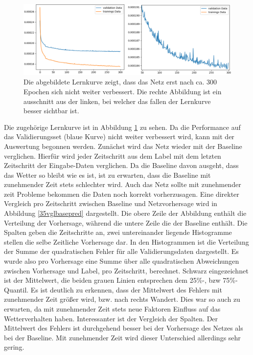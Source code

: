 \begin{figure}[h]
	\centering
	\includegraphics[width=\linewidth]{pics/lc_35minMSE.png}
	\caption[Lernkurve des UNet zur 35 Minuten Radar-Vorhersage.]{Die abgebildete Lernkurve zeigt, dass das Netz erst nach ca. 300 Epochen sich nicht weiter verbessert. Die rechte Abbildung ist ein ausschnitt aus der linken, bei welcher das fallen der Lernkurve besser sichtbar ist.}
	\label{lc_35minMSE}
\end{figure}

Die zugehörige Lernkurve ist in Abbildung \ref{lc_35minMSE} zu sehen. Da die Performance auf das Validierungsset (blaue Kurve) nicht weiter verbessert wird, kann mit der Auswertung begonnen werden.
Zunächst wird das Netz wieder mit der Baseline verglichen. Hierfür wird jeder Zeitschritt aus dem Label mit dem letzten Zeitschritt der Eingabe-Daten verglichen. Da die Baseline davon ausgeht, dass das Wetter so bleibt wie es ist, ist zu erwarten, dass die Baseline mit zunehmender Zeit stets schlechter wird. Auch das Netz sollte mit zunehmender zeit Probleme bekommen die Daten noch korrekt vorherzusagen. Eine direkter Vergleich pro Zeitschritt zwischen Baseline und Netzvorhersage wird in Abbildung \ref{35vglbasepred} dargestellt.
Die obere Zeile der Abbildung enthält die Verteilung der Vorhersage, während die untere Zeile die der Baseline enthält. Die Spalten geben die Zeitschritte an, zwei untereinander liegende Histogramme stellen die selbe Zeitliche Vorhersage dar. 
In den Histogrammen ist die Verteilung der Summe der quadratischen Fehler für alle Validierungsdaten dargestellt. Es wurde also pro Vorhersage eine Summe über alle quadratischen Abweichungen zwischen Vorhersage und Label, pro Zeitschritt, berechnet.
Schwarz eingezeichnet ist der Mittelwert, die beiden grauen Linien entsprechen dem 25\%-, bzw 75\%-Quantil. Es ist deutlich zu erkennen, dass der Mittelwert des Fehlers mit zunehmender Zeit größer wird, bzw. nach rechts Wandert. Dies war so auch zu erwarten, da mit zunehmender Zeit stets neue Faktoren Einfluss auf das Wetterverhalten haben. Interessanter ist der Vergleich der Spalten. Der Mittelwert des Fehlers ist durchgehend besser bei der Vorhersage des Netzes als bei der Baseline. Mit zunehmender Zeit wird dieser Unterschied allerdings sehr gering.

